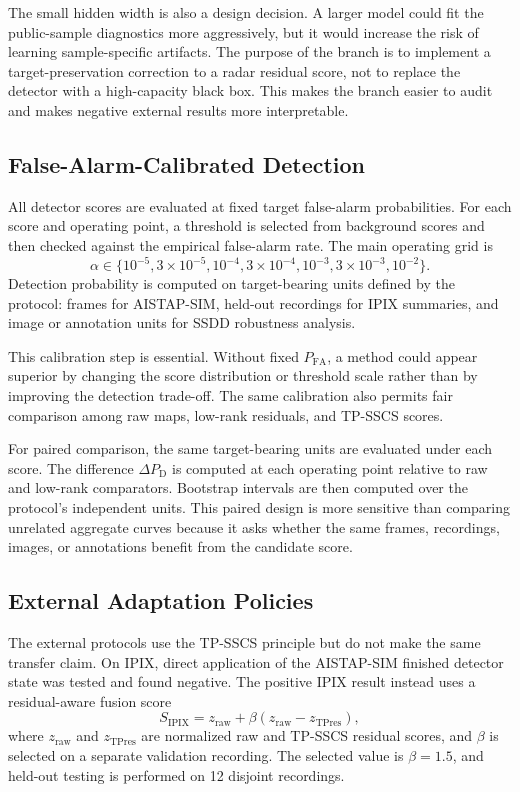 \documentclass[journal]{IEEEtran}
\begin{document}
The small hidden width is also a design decision. A larger model could fit the public-sample diagnostics more aggressively, but it would increase the risk of learning sample-specific artifacts. The purpose of the branch is to implement a target-preservation correction to a radar residual score, not to replace the detector with a high-capacity black box. This makes the branch easier to audit and makes negative external results more interpretable.

\subsection{False-Alarm-Calibrated Detection}

All detector scores are evaluated at fixed target false-alarm probabilities. For each score and operating point, a threshold is selected from background scores and then checked against the empirical false-alarm rate. The main operating grid is
\begin{equation}
    \alpha \in \{10^{-5}, 3\times10^{-5}, 10^{-4}, 3\times10^{-4},
    10^{-3}, 3\times10^{-3}, 10^{-2}\}.
\end{equation}
Detection probability is computed on target-bearing units defined by the protocol: frames for AISTAP-SIM, held-out recordings for IPIX summaries, and image or annotation units for SSDD robustness analysis.

This calibration step is essential. Without fixed $P_{\mathrm{FA}}$, a method could appear superior by changing the score distribution or threshold scale rather than by improving the detection trade-off. The same calibration also permits fair comparison among raw maps, low-rank residuals, and TP-SSCS scores.

For paired comparison, the same target-bearing units are evaluated under each score. The difference $\Delta P_{\mathrm{D}}$ is computed at each operating point relative to raw and low-rank comparators. Bootstrap intervals are then computed over the protocol's independent units. This paired design is more sensitive than comparing unrelated aggregate curves because it asks whether the same frames, recordings, images, or annotations benefit from the candidate score.

\subsection{External Adaptation Policies}

The external protocols use the TP-SSCS principle but do not make the same transfer claim. On IPIX, direct application of the AISTAP-SIM finished detector state was tested and found negative. The positive IPIX result instead uses a residual-aware fusion score
\begin{equation}
    S_{\mathrm{IPIX}} = z_{\mathrm{raw}} + \beta
    (z_{\mathrm{raw}} - z_{\mathrm{TPres}}),
\end{equation}
where $z_{\mathrm{raw}}$ and $z_{\mathrm{TPres}}$ are normalized raw and TP-SSCS residual scores, and $\beta$ is selected on a separate validation recording. The selected value is $\beta=1.5$, and held-out testing is performed on 12 disjoint recordings.
\end{document}
